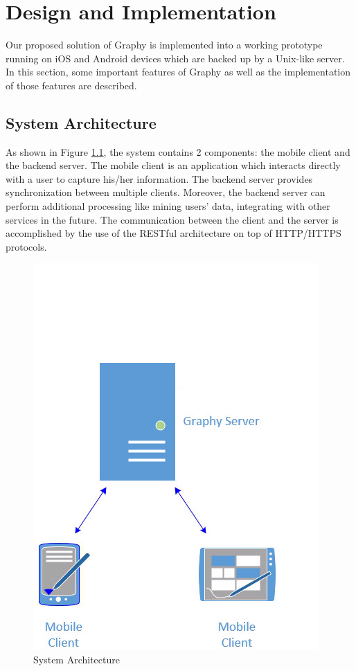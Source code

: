 \chapter{Design and Implementation}
\label{implementation}
Our proposed solution of Graphy is implemented into a working prototype running on iOS and Android devices which are backed up by a Unix-like server. In this section, some important features of Graphy as well as the implementation of those features are described.
\section{System Architecture}
As shown in Figure \ref{fg:architecture}, the system contains 2 components: the mobile client and the backend server. The mobile client is an application which interacts directly with a user to capture his/her information. The backend server provides synchronization between multiple clients. Moreover, the backend server can perform additional processing like mining users' data, integrating with other services in the future. The communication between the client and the server is accomplished by the use of the RESTful architecture on top of HTTP/HTTPS protocols.

\begin{figure}[!h]
\begin{centering}
\includegraphics[scale=0.6]{pics/architecture}
\caption{System Architecture}\label{fg:architecture}
\end{centering}
\end{figure}

